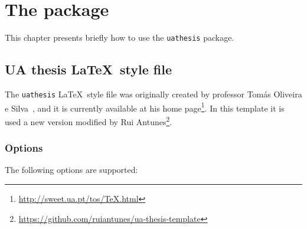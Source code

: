 \chapter{The package}
\label{c1}

This chapter presents briefly how to use the \verb+uathesis+ package.


\section{UA thesis \LaTeX\ style file}
\label{c1:s:uathesis-style-file}

The \verb+uathesis+ \LaTeX\ style file was originally created by professor Tomás Oliveira e Silva~\parencite*{oliveiraesilva2012a}, and it is currently available at his home page\footnote{\url{http://sweet.ua.pt/tos/TeX.html}}.
In this template it is used a new version modified by Rui Antunes\footnote{\url{https://github.com/ruiantunes/ua-thesis-template}}.


\subsection{Options}
\label{c1:ss:options}

The following options are supported:

